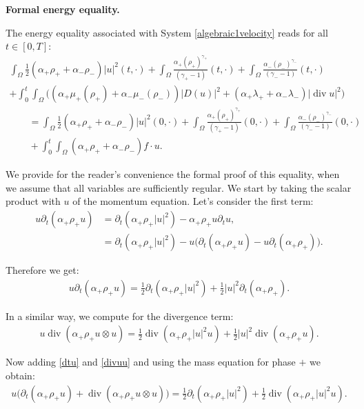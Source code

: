 \documentclass[11pt, twoside, a4paper]{article}
\theoremstyle{plain}
\theoremstyle{remark}
\numberwithin{equation}{section}
\renewcommand{\div}{\operatorname{div}}
\newcommand{\dt}{\partial_t}
\newcommand{\ap}{\alpha_+}
\newcommand{\am}{\alpha_-}
\newcommand{\rp}{\rho_+}
\newcommand{\rmi}{\rho_-}
\begin{document}
\noindent \textbf{Formal energy equality.}

The energy equality associated with System \eqref{algebraic1velocity} reads for all $t \in[0, T]$:
\begin{multline}\label{energy_estimate_eps}
        \int_{\Omega} \frac{1}{2}\left(\alpha_+\rho_{+}+\alpha_-\rho_-\right)|u|^2(t,\cdot) +\int_{\Omega} \frac{\alpha_{+} (\rho_{+})^{\gamma_{+}}}{(\gamma_{+}-1)}(t,\cdot) +\int_{\Omega} \frac{\alpha_-(\rho_{-})^{\gamma_{-}}}{(\gamma_--1)}(t,\cdot) \\
        + \int_0^t\!\!\! \int_\Omega \Big( (\ap \mu_+(\rp) + \am \mu_-(\rmi)) \lvert D(u) \rvert^2 + (\ap \lambda_+ + \am \lambda_-) \lvert \div u \rvert^2 \Big) \\
        \quad \quad = \int_{\Omega} \frac{1}{2}\left(\alpha_{+} \rho_{+}+\alpha_-\rho_-\right)|u|^2(0,\cdot) +\int_{\Omega} \frac{\alpha_{+} (\rho_{+})^{\gamma_{+}}}{(\gamma_{+}-1)}(0,\cdot)+\int_{\Omega} \frac{\alpha_-(\rho_-)^{\gamma_-}}{(\gamma_{-}-1)}(0,\cdot) \\
        \quad \quad + \int_0^t\!\!\! \int_\Omega (\ap \rp + \am \rmi) f \cdot u.
\end{multline}

We provide for the reader's convenience the formal proof of this equality, when we assume that all variables are sufficiently regular. We start by taking the scalar product with $u$ of the momentum equation. Let's consider the first term:
\begin{align*}
    u \dt (\ap \rp u) &= \dt (\ap \rp |u|^2) - \ap \rp u \dt u,\\
     &= \dt (\ap \rp |u|^2) - u \Big( \dt (\ap \rp u) - u \dt (\ap \rp)\Big).
\end{align*}

Therefore we get:
\begin{align}\label{dtu}
    u \dt (\ap \rp u) = \frac{1}{2} \dt (\ap \rp |u|^2) + \frac{1}{2} |u|^2 \dt (\ap \rp).
\end{align}

In a similar way, we compute for the divergence term:
\begin{align}\label{divuu}
    u \div (\ap \rp u \otimes u) = \frac{1}{2} \div (\ap \rp |u|^2 u) + \frac{1}{2} |u|^2 \div (\ap \rp u).
\end{align}

Now adding \eqref{dtu} and \eqref{divuu} and using the mass equation for phase $+$ we obtain:
\begin{align}
    u \Big(\dt (\ap \rp u) + \div (\ap \rp u \otimes u) \Big) = \frac{1}{2} \dt (\ap \rp |u|^2) + \frac{1}{2} \div (\ap \rp |u|^2 u).\label{momu1}
\end{align}
\end{document}
